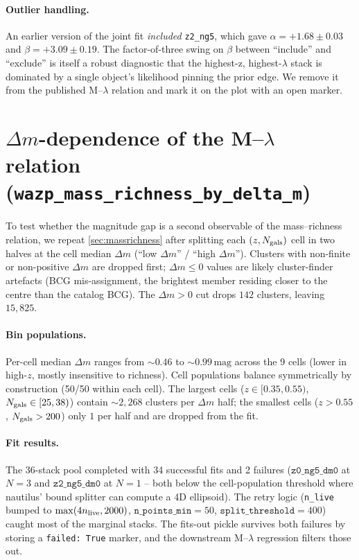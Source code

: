 \documentclass[11pt,a4paper]{article}
\newcommand{\dm}{\Delta m}
\begin{document}
\paragraph{Outlier handling.} An earlier version of the joint fit
\emph{included} \verb|z2_ng5|, which gave $\alpha=+1.68\pm0.03$ and
$\beta=+3.09\pm0.19$. The factor-of-three swing on $\beta$ between
``include'' and ``exclude'' is itself a robust diagnostic that the highest-z,
highest-$\lambda$ stack is dominated by a single object's likelihood pinning
the prior edge. We remove it from the published M--$\lambda$ relation and
mark it on the plot with an open marker.

\section{$\dm$-dependence of the M--$\lambda$ relation
(\texttt{wazp\_mass\_richness\_by\_delta\_m})}
\label{sec:dmsplit}

To test whether the magnitude gap is a second observable of the
mass--richness relation, we repeat \autoref{sec:massrichness} after splitting
each $(z, N_{\rm gals})$ cell in two halves at the cell median $\dm$
(``low $\dm$'' / ``high $\dm$''). Clusters with non-finite or non-positive
$\dm$ are dropped first; $\dm\le 0$ values are likely cluster-finder
artefacts (BCG mis-assignment, the brightest member residing closer to the
centre than the catalog BCG). The $\dm>0$ cut drops $142$ clusters, leaving
$15{,}825$.

\paragraph{Bin populations.} Per-cell median $\dm$ ranges from
$\sim 0.46$ to $\sim 0.99\,\mathrm{mag}$ across the 9 cells (lower in
high-$z$, mostly insensitive to richness). Cell populations balance
symmetrically by construction (50/50 within each cell). The largest cells
($z\in[0.35,0.55)$, $N_{\rm gals}\in[25,38)$) contain
$\sim 2{,}268$ clusters per $\dm$ half; the smallest cells
($z>0.55$, $N_{\rm gals}>200$) only $1$ per half and are dropped from the
fit.

\paragraph{Fit results.} The 36-stack pool completed with 34 successful
fits and 2 failures ($\mathtt{z0\_ng5\_dm0}$ at $N=3$ and
$\mathtt{z2\_ng5\_dm0}$ at $N=1$ -- both below the cell-population threshold
where nautilus' bound splitter can compute a 4D ellipsoid). The retry logic
(\texttt{n\_live} bumped to $\max(4n_{\rm live}, 2000)$,
$\texttt{n\_points\_min}=50$, $\texttt{split\_threshold}=400$) caught most of
the marginal stacks. The fits-out pickle survives both failures by storing a
\texttt{failed: True} marker, and the downstream M--$\lambda$ regression
filters those out.
\end{document}
